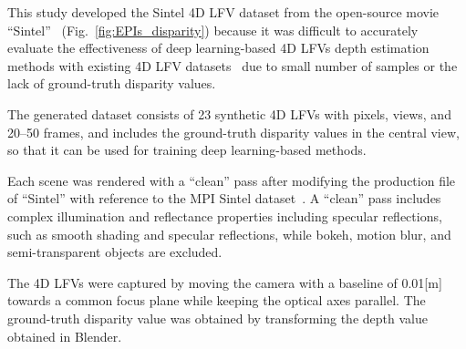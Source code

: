 \documentclass[]{spie}
\newcommand{\jtextd}[1]{}
\begin{document}
\jtextd{
   4D LFVsからの奥行き画像生成方式の性能評価を行うために，
``Sintel''~\cite{sintel2010}からSintel 4D LFVsデータセットを作成した
   （図~\ref{fig:EPIs_disparity}）．
   既存の公開されている4D LFVsデータセット~\cite{wang2017light,brizzi2019feature}
では，サンプル数が少ないか，ground-truth奥行きが提供されていないために，
   深層学習ベースの4D LFVs奥行き推定手法の有効性を
   十分に
   検証することが難しい．
作成したデータセットは，画素，
視点，
   20～50フレームを持つ23の合成4D LFVで構成され，
   中央ビューにおけるground-truth奥行きを持つため，深層学習モデルを十分に訓練可能である．
}

This study developed the Sintel 4D LFV dataset from the open-source movie ``Sintel''~\cite{sintel2010}
(Fig.~\ref{fig:EPIs_disparity})
because it was difficult to accurately evaluate the effectiveness of 
deep learning-based 4D LFVs depth estimation methods 
with existing 4D LFV datasets~\cite{wang2017light,brizzi2019feature}
due to small number of samples or the lack of ground-truth disparity values.


The generated dataset consists of 23 synthetic 4D LFVs 
with  pixels,  views, and 20--50 frames, 
and includes the ground-truth disparity values in the central view, 
so that it can be used for training deep learning-based methods.


\jtextd{
  それぞれのシーンは，MPI Sintelデータセット~\cite{butler2012naturalistic}
を参考に
  ``Sintel''のプロダクションファイルを修正し，``clean''パスでレンダリングを行った．
  ``clean''パスは，滑らかな陰影や鏡面反射など，複雑な照明と反射特性が含まれている一方で，
  ボケやモーションブラー，半透明オブジェクトは除外されている．
}

Each scene was rendered with a ``clean'' pass 
after modifying the production file of ``Sintel'' 
with reference to the MPI Sintel dataset~\cite{butler2012naturalistic}.
A ``clean'' pass includes
complex illumination and reflectance properties including specular reflections,
such as smooth shading and specular reflections,
while bokeh, motion blur, and semi-transparent objects are excluded.
\jtextd{
  4D LFVsの撮影は，光軸を平行に保ちながらカメラを共通の焦点面に
  向かって移動させて行った．
視差マップは，Blender
で得られる奥行きマップを
  次の式を用いて変換することで取得した．
  
  ここで，はベースライン，は焦点距離，は奥行きである．
  この変換により得られた視差マップは，ほとんどのシーンでは[0, 1]の範囲内にあるが，
  いくつかのシーンでは1.5まである．
}
The 4D LFVs were captured by moving the camera
with a baseline of 0.01[m]
towards a common focus plane while keeping the optical axes parallel.
The ground-truth disparity value was obtained by transforming 
the depth value obtained in Blender.
\end{document}
